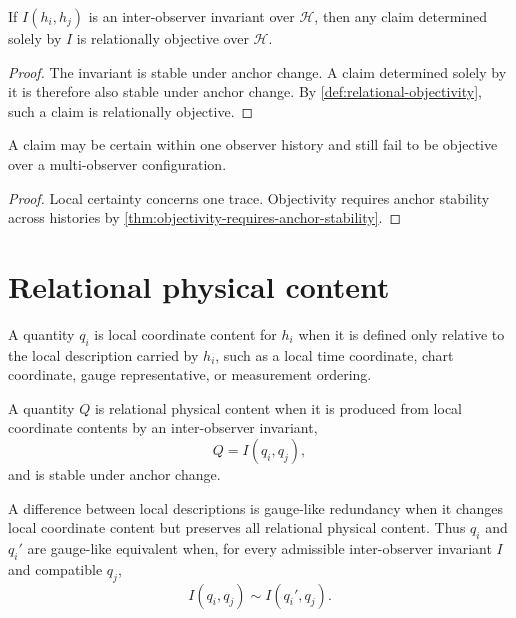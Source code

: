 \begin{theorem}
\label{thm:invariants-generate-relational-objectivity}
If $I(h_i,h_j)$ is an inter-observer invariant over $\mathcal H$, then any claim determined solely by $I$ is relationally objective over $\mathcal H$.
\end{theorem}

\begin{proof}
The invariant is stable under anchor change. A claim determined solely by it is therefore also stable under anchor change. By \autoref{def:relational-objectivity}, such a claim is relationally objective.
\end{proof}

\begin{corollary}
\label{cor:objectivity-not-local-certainty}
A claim may be certain within one observer history and still fail to be objective over a multi-observer configuration.
\end{corollary}

\begin{proof}
Local certainty concerns one trace. Objectivity requires anchor stability across histories by \autoref{thm:objectivity-requires-anchor-stability}.
\end{proof}

\section{Relational physical content}
\label{sec:relational-physical-content}

\begin{definition}
\label{def:local-coordinate-content}
A quantity $q_i$ is local coordinate content for $h_i$ when it is defined only relative to the local description carried by $h_i$, such as a local time coordinate, chart coordinate, gauge representative, or measurement ordering.
\end{definition}

\begin{definition}
\label{def:relational-physical-content}
A quantity $Q$ is relational physical content when it is produced from local coordinate contents by an inter-observer invariant,
$$
Q=I(q_i,q_j),
$$
and is stable under anchor change.
\end{definition}

\begin{definition}
\label{def:gauge-like-redundancy}
A difference between local descriptions is gauge-like redundancy when it changes local coordinate content but preserves all relational physical content. Thus $q_i$ and $q_i'$ are gauge-like equivalent when, for every admissible inter-observer invariant $I$ and compatible $q_j$,
$$
I(q_i,q_j)\sim I(q_i',q_j).
$$
\end{definition}

